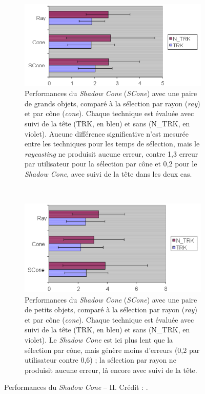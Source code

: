 	\begin{figure}[!htb]
		\begin{subfigure}[t]{0.49\textwidth}
			\centering
			\includegraphics[width=\textwidth]{figures/ch2/shadowPLarge}
			\caption{Performances du \emph{Shadow Cone} (\emph{SCone}) avec une paire de grands objets, comparé à la sélection par rayon (\emph{ray}) et par cône (\emph{cone}). Chaque technique est évaluée avec suivi de la tête (TRK, en bleu) et sans (N\_{}TRK, en violet). Aucune différence significative n'est mesurée entre les techniques pour les temps de sélection, mais le \emph{raycasting} ne produisit aucune erreur, contre 1,3 erreur par utilisateur pour la sélection par cône et 0,2 pour le \emph{Shadow Cone}, avec suivi de la tête dans les deux cas.}
			\label{fig:shadowPLarge}
		\end{subfigure}
		~
		\begin{subfigure}[t]{0.49\textwidth}
			\centering
			\includegraphics[width=\textwidth]{figures/ch2/shadowPSmall}
			\caption{Performances du \emph{Shadow Cone} (\emph{SCone}) avec une paire de petits objets, comparé à la sélection par rayon (\emph{ray}) et par cône (\emph{cone}). Chaque technique est évaluée avec suivi de la tête (TRK, en bleu) et sans (N\_{}TRK, en violet). Le \emph{Shadow Cone} est ici plus lent que la sélection par cône, mais génère moins d'erreurs (0,2 par utilisateur contre 0,6) ; la sélection par rayon ne produisit aucune erreur, là encore avec suivi de la tête.}
			\label{fig:shadowPSmall}
		\end{subfigure}
		\caption[Performances du \emph{Shadow Cone} -- II]{Performances du \emph{Shadow Cone} -- II. Crédit : \cite{steed20043d}.}
		\label{fig:shadowConePerf2}
	\end{figure}

